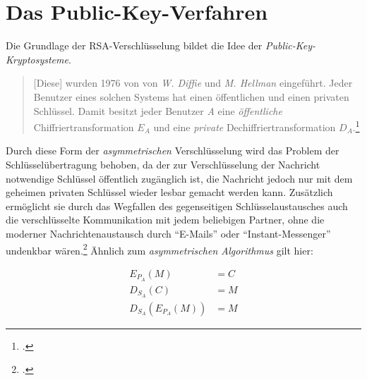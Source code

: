 \documentclass{scrarticle}
\begin{document}
        \section[Public-Key-Kryptosysteme]{Das Public-Key-Verfahren}
        Die Grundlage der RSA-Verschlüsselung bildet die Idee der \emph{Public-Key-Kryptosysteme}.

        \begin{quote}
            [Diese] wurden 1976 von von \emph{W. Diffie} und \emph{M. Hellman} eingeführt. Jeder Benutzer eines solchen Systems hat einen öffentlichen und einen privaten Schlüssel. Damit besitzt jeder Benutzer \emph{A} eine \emph{öffentliche} Chiffriertransformation $E_A$ und eine \emph{private} Dechiffriertransformation $D_A$.\footcite[67]{watjen2008}
        \end{quote} %
        Durch diese Form der \emph{asymmetrischen} Verschlüsselung wird das Problem der Schlüsselübertragung behoben, da der zur Verschlüsselung der Nachricht notwendige Schlüssel öffentlich zugänglich ist, die Nachricht jedoch nur mit dem geheimen privaten Schlüssel wieder lesbar gemacht werden kann. Zusätzlich ermöglicht sie durch das Wegfallen des gegenseitigen Schlüsselaustausches auch die verschlüsselte Kommunikation mit jedem beliebigen Partner, ohne die moderner Nachrichtenaustausch durch \enquote{E-Mails} oder \enquote{Instant-Messenger} undenkbar wären.\footcite[vgl.][21]{ertel2003} Ähnlich zum \emph{asymmetrischen Algorithmus} gilt hier:

        \begin{align}
            E_{P_A}(M) &= C \\
            D_{S_A}(C) &= M \\
            D_{S_A}\left(E_{P_A}(M)\right) &= M
        \end{align}
\end{document}
